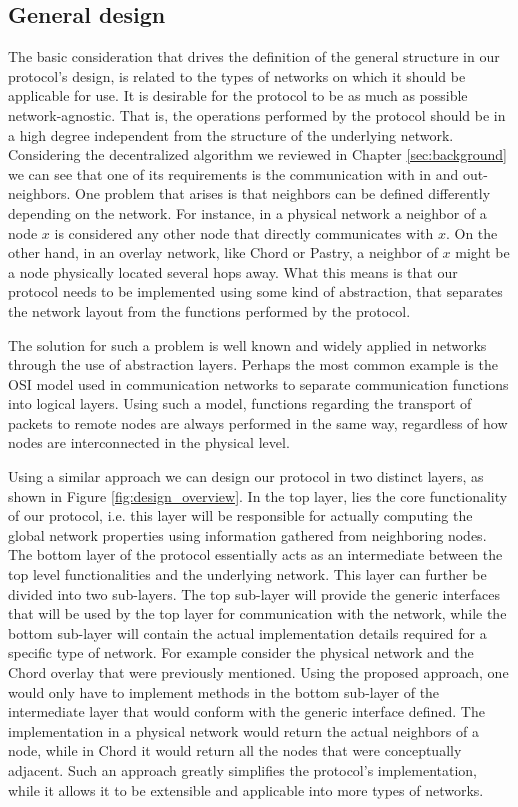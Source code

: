 \documentclass[MSc]{icldt}
\begin{document}
\subsection{General design}

The basic consideration that drives the definition of the general structure in our protocol's design, is related to the types of networks on which it should be applicable for use. It is desirable for the protocol to be as much as possible network-agnostic. That is, the operations performed by the protocol should be in a high degree independent from the structure of the underlying network. Considering the decentralized algorithm we reviewed in Chapter \ref{sec:background} we can see that one of its requirements is the communication with in and out-neighbors. One problem that arises is that neighbors can be defined differently depending on the network. For instance, in a physical network a neighbor of a node $x$ is considered any other node that directly communicates with $x$. On the other hand, in an overlay network, like Chord or Pastry, a neighbor of $x$ might be a node physically located several hops away. What this means is that our protocol needs to be implemented using some kind of abstraction, that separates the network layout from the functions performed by the protocol.

The solution for such a problem is well known and widely applied in networks through the use of abstraction layers. Perhaps the most common example is the OSI model \cite{citeulike:915718} used in communication networks to separate communication functions into logical layers. Using such a  model, functions regarding the transport of packets to remote nodes are always performed in the same way, regardless of how nodes are interconnected in the physical level. 

Using a similar approach we can design our protocol in two distinct layers, as shown in Figure \ref{fig:design_overview}. In the top layer, lies the core functionality of our protocol, i.e. this layer will be responsible for actually computing the global network properties using information gathered from neighboring nodes. The bottom layer of the protocol essentially acts as an intermediate between the top level functionalities and the underlying network. This layer can further be divided into two sub-layers. The top sub-layer will provide the generic interfaces that will be used by the top layer for communication with the network, while the bottom sub-layer will contain the actual implementation details required for a specific type of network. For example consider the physical network and the Chord overlay that were previously mentioned. Using the proposed approach, one would only have to implement methods in the bottom sub-layer of the intermediate layer that would conform with the generic interface defined. The implementation in a physical network would return the actual neighbors of a node, while in Chord it would return all the nodes that were conceptually adjacent. Such an approach greatly simplifies the protocol's implementation, while it allows it to be extensible and applicable into more types of networks. 
\end{document}
